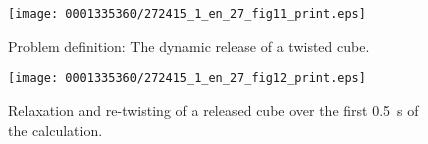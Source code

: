 \begin{figure}[!t]
\texttt{[image: 0001335360/272415\_1\_en\_27\_fig11\_print.eps]}
\caption{Problem definition: The dynamic release of a twisted cube.}
\label{code:narayanan:dynamicrelease}\vspace*{-2pt}
\end{figure}

\begin{figure} %
\texttt{[image: 0001335360/272415\_1\_en\_27\_fig12\_print.eps]}
  \caption{Relaxation and re-twisting of a
      released cube over the first 0.5~s of the
      calculation.\label{fig:narayanan:releasedcube}}%
\end{figure}

